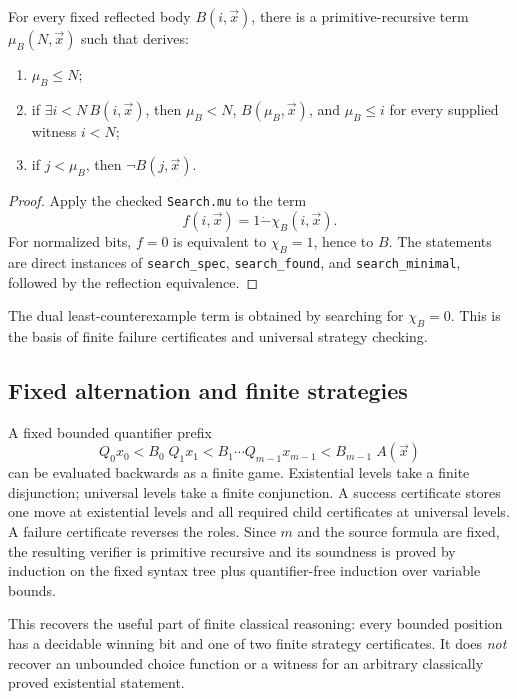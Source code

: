 \begin{corollary}
\label{cor:least-bounded-witness}
For every fixed reflected body \(B(i,\vec x)\), there is a primitive-recursive term \(\mu_B(N,\vec x)\) such that \iPRA{} derives:
\begin{enumerate}[label=(\roman*),leftmargin=2.3em]
\item \(\mu_B\leq N\);
\item if \(\exists i<N\,B(i,\vec x)\), then \(\mu_B<N\), \(B(\mu_B,\vec x)\), and \(\mu_B\leq i\) for every supplied witness \(i<N\);
\item if \(j<\mu_B\), then \(\neg B(j,\vec x)\).
\end{enumerate}
\end{corollary}

\begin{proof}
Apply the checked \texttt{Search.mu} to the term
\[
  f(i,\vec x)=1\dot{-}\chi_B(i,\vec x).
\]
For normalized bits, \(f=0\) is equivalent to \(\chi_B=1\), hence to \(B\).  The statements are direct instances of \texttt{search\_spec}, \texttt{search\_found}, and \texttt{search\_minimal}, followed by the reflection equivalence.
\end{proof}

The dual least-counterexample term is obtained by searching for \(\chi_B=0\).  This is the basis of finite failure certificates and universal strategy checking.

\subsection{Fixed alternation and finite strategies}

A fixed bounded quantifier prefix
\[
  Q_0x_0<B_0\;Q_1x_1<B_1\cdots Q_{m-1}x_{m-1}<B_{m-1}\;A(\vec x)
\]
can be evaluated backwards as a finite game.  Existential levels take a finite disjunction; universal levels take a finite conjunction.  A success certificate stores one move at existential levels and all required child certificates at universal levels.  A failure certificate reverses the roles.  Since \(m\) and the source formula are fixed, the resulting verifier is primitive recursive and its soundness is proved by induction on the fixed syntax tree plus quantifier-free induction over variable bounds.

This recovers the useful part of finite classical reasoning: every bounded position has a decidable winning bit and one of two finite strategy certificates.  It does \emph{not} recover an unbounded choice function or a witness for an arbitrary classically proved existential statement.

